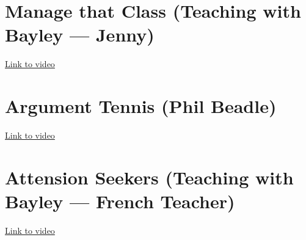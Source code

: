 \documentclass[12pt]{report}
\begin{document}
\section{Manage that Class (Teaching with Bayley --- Jenny)}

\href{http://archive.teachfind.com/ttv/www.teachers.tv/videos/manage-that-class-year-8-friday.html}{Link to video}



% 




\section{Argument Tennis (Phil Beadle)}

\href{https://www.youtube.com/watch?v=zr2xdjQPH4I (Links to an external site.)Links to an external site.}{Link to video}




% 





\section{Attension Seekers (Teaching with Bayley --- French Teacher)}

\href{https://www.youtube.com/watch?v=pXhtwDK4oHw}{Link to video}





% 
% 
% 
% 
% 
\end{document}
